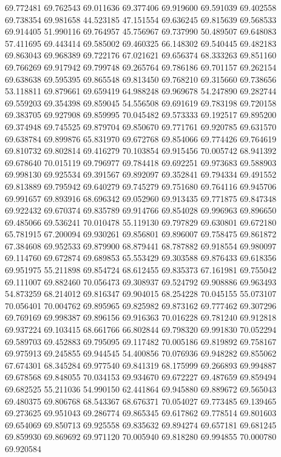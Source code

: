 69.772481
69.762543
69.011636
69.377406
69.919600
69.591039
69.402558
69.738354
69.981658
44.523185
47.151554
69.636245
69.815639
69.568533
69.914405
51.990116
69.764957
45.756967
69.737990
50.489507
69.648083
57.411695
69.443414
69.585002
69.460325
66.148302
69.540445
69.482183
69.863043
69.968389
69.722176
67.021621
69.656374
68.333263
69.851160
69.766269
69.917942
69.799748
69.265764
69.786186
69.701157
69.262154
69.638638
69.595395
69.865548
69.813450
69.768210
69.315660
69.738656
53.118811
69.879661
69.659419
64.988248
69.969678
54.247890
69.282744
69.559203
69.354398
69.859045
54.556508
69.691619
69.783198
69.720158
69.383705
69.927908
69.859995
70.045482
69.573333
69.192517
69.895200
69.374948
69.745525
69.879704
69.850670
69.771761
69.920785
69.631570
69.638784
69.899876
65.831970
69.672768
69.854066
69.774426
69.764619
69.810732
69.802814
69.416279
70.103854
69.915456
70.005742
68.941392
69.678640
70.015119
69.796977
69.784418
69.692251
69.973683
69.588903
69.998130
69.925534
69.391567
69.892097
69.352841
69.794334
69.491552
69.813889
69.795942
69.640279
69.745279
69.751680
69.764116
69.945706
69.991657
69.893916
68.696342
69.052960
69.913435
69.771875
69.847348
69.922432
69.670374
69.835789
69.914766
69.854028
69.996963
69.896650
69.485066
69.536241
70.010478
55.119130
69.797829
69.630801
69.672180
65.781915
67.200094
69.930261
69.856801
69.896007
69.758475
69.861872
67.384608
69.952533
69.879900
68.879441
68.787882
69.918554
69.980097
69.114760
69.672874
69.689853
65.553429
69.303588
69.876433
69.618356
69.951975
55.211898
69.854724
68.612455
69.835373
67.161981
69.755042
69.111007
69.882460
70.056473
69.308937
69.524792
69.908886
69.963493
54.873259
68.214012
69.816347
69.904015
68.254228
70.045155
55.073107
70.056401
70.004762
69.895965
69.825982
69.873162
69.777462
69.307296
69.769169
69.998387
69.896156
69.916363
70.016228
69.781240
69.912818
69.937224
69.103415
68.661766
66.802844
69.798320
69.991830
70.052294
69.589703
69.452883
69.795095
69.117482
70.005186
69.819892
69.758167
69.975913
69.245855
69.944545
54.400856
70.076936
69.948282
69.855062
67.674301
68.345284
69.977540
69.841319
68.175999
69.266893
69.994887
69.678568
69.848055
70.034153
69.934670
69.672227
69.487659
69.859494
69.682525
55.211036
54.990150
62.441864
69.945880
69.889672
69.565043
69.480375
69.806768
68.543367
68.676371
70.054027
69.773485
69.139465
69.273625
69.951043
69.286774
69.865345
69.617862
69.778514
69.801603
69.654069
69.850713
69.925558
69.835632
69.894274
69.657181
69.681245
69.859930
69.869692
69.971120
70.005940
69.818280
69.994855
70.000780
69.920584
